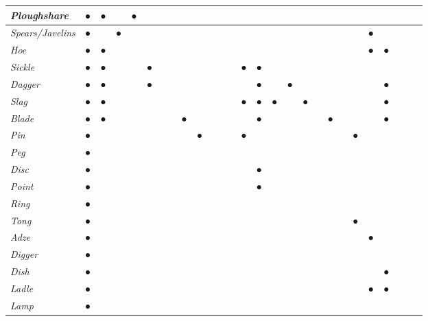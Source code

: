 \begin{longtable}{|l|l|l|l|l|l|l|l|l|l|l|l|l|l|l|l|l|l|l|l|l|l|l|l|l|l|l|}
\hline
\textit{Ploughshare} & ● & ● &  & ● &  &  &  &  &  &  &  &  &  &  &  &  &  &  &  &  &  &  &  &  &  &  \\
\hline
\textit{Spears/Javelins} & ● &  & ● &  &  &  &  &  &  &  &  &  &  &  &  &  &  &  &  &  &  & ● &  &  &  &  \\
\hline
\textit{Hoe} & ● & ● &  &  &  &  &  &  &  &  &  &  &  &  &  &  &  &  &  &  &  & ● & ● &  &  &  \\
\hline
\textit{Sickle} & ● & ● &  &  & ● &  &  &  &  &  &  &  & ● & ● &  &  &  &  &  &  &  &  &  &  &  &  \\
\hline
\textit{Dagger} & ● & ● &  &  & ● &  &  &  &  &  &  &  &  & ● &  & ● &  &  &  &  &  &  & ● &  &  &  \\
\hline
\textit{Slag} & ● & ● &  &  &  &  &  &  &  &  &  &  & ● & ● & ● &  & ● &  &  &  &  &  & ● &  &  &  \\
\hline
\textit{Blade} & ● & ● &  &  &  &  &  & ● &  &  &  &  &  & ● &  &  &  &  & ● &  &  &  & ● &  &  &  \\
\hline
\textit{Pin} & ● &  &  &  &  &  &  &  & ● &  &  &  & ● &  &  &  &  &  &  &  & ● &  &  &  &  &  \\
\hline
\textit{Peg} & ● &  &  &  &  &  &  &  &  &  &  &  &  &  &  &  &  &  &  &  &  &  &  &  &  &  \\
\hline
\textit{Disc} & ● &  &  &  &  &  &  &  &  &  &  &  &  & ● &  &  &  &  &  &  &  &  &  &  &  &  \\
\hline
\textit{Point} & ● &  &  &  &  &  &  &  &  &  &  &  &  & ● &  &  &  &  &  &  &  &  &  &  &  &  \\
\hline
\textit{Ring} & ● &  &  &  &  &  &  &  &  &  &  &  &  &  &  &  &  &  &  &  &  &  &  &  &  &  \\
\hline
\textit{Tong} & ● &  &  &  &  &  &  &  &  &  &  &  &  &  &  &  &  &  &  &  & ● &  &  &  &  &  \\
\hline
\textit{Adze} & ● &  &  &  &  &  &  &  &  &  &  &  &  &  &  &  &  &  &  &  &  & ● &  &  &  &  \\
\hline
\textit{Digger} & ● &  &  &  &  &  &  &  &  &  &  &  &  &  &  &  &  &  &  &  &  &  &  &  &  &  \\
\hline
\textit{Dish} & ● &  &  &  &  &  &  &  &  &  &  &  &  &  &  &  &  &  &  &  &  &  & ● &  &  &  \\
\hline
\textit{Ladle} & ● &  &  &  &  &  &  &  &  &  &  &  &  &  &  &  &  &  &  &  &  & ● & ● &  &  &  \\
\hline
\textit{Lamp} & ● &  &  &  &  &  &  &  &  &  &  &  &  &  &  &  &  &  &  &  &  &  &  &  &  &  \\

\end{longtable}
